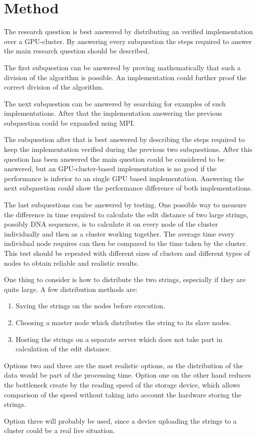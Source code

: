 \section{Method}
The research question is best answered by distributing an verified implementation over a GPU-cluster.
By answering every subquestion the steps required to answer the main research question should be described.

The first subquestion can be answered by proving mathematically that such a division of the algorithm is possible.
An implementation could further proof the correct division of the algorithm.

The next subquestion can be answered by searching for examples of such implementations.
After that the implementation answering the previous subquestion could be expanded using MPI.

The subquestion after that is best answered by describing the steps required to keep the implementation verified during the previous two subquestions.
After this question has been answered the main question could be considered to be answered, but an GPU-cluster-based implementation is no good if the performance is inferior to an single GPU based implementation.
Answering the next subquestion could show the performance difference of both implementations.

The last subquestions can be answered by testing.
One possible way to measure the difference in time required to calculate the edit distance of two large strings, possibly DNA sequences, is to calculate it on every node of the cluster individually and then as a cluster working together.
The average time every individual node requires can then be compared to the time taken by the cluster.
This test should be repeated with different sizes of clusters and different types of nodes to obtain reliable and realistic results.

One thing to consider is how to distribute the two strings, especially if they are quite large. A few distribution methods are:
\begin{enumerate}
    \item Saving the strings on the nodes before execution.
    \item Choosing a master node which distributes the string to its slave nodes.
    \item Hosting the strings on a separate server which does not take part in calculation of the edit distance.
\end{enumerate}
Options two and three are the most realistic options, as the distribution of the data would be part of the processing time. Option one on the other hand reduces the bottleneck create by the reading speed of the storage device, which allows comparison of the speed without taking into account the hardware storing the strings.

Option three will probably be used, since a device uploading the strings to a cluster could be a real live situation.

